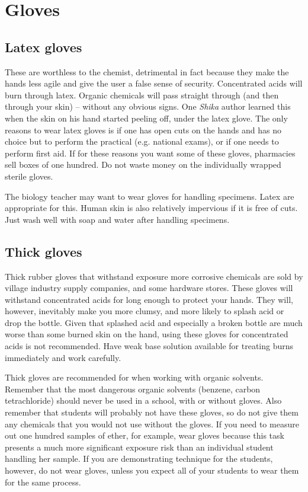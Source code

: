 \section{Gloves}
\label{sec:gloves}

\subsection{Latex gloves}
These are worthless to the chemist, 
detrimental in fact because they make the hands less agile 
and give the user a false sense of security. 
Concentrated acids will burn through latex. 
Organic chemicals will pass straight through (and then through your skin) -- 
without any obvious signs. 
One \textit{Shika} author learned this when the skin on his hand started peeling off, 
under the latex glove. 
The only reasons to wear latex gloves is if one has open cuts on the hands 
and has no choice but to perform the practical (e.g. 
national exams), 
or if one needs to perform first aid. 
If for these reasons you want some of these gloves, 
pharmacies sell boxes of one hundred. 
Do not waste money on the individually wrapped sterile gloves.

The biology teacher may want to wear gloves for handling specimens. 
Latex are appropriate for this. 
Human skin is also relatively impervious if it is free of cuts. 
Just wash well with soap and water after handling specimens.

\subsection{Thick gloves}
Thick rubber gloves that withstand exposure more corrosive chemicals 
are sold by village industry supply companies, 
and some hardware stores. 
These gloves will withstand concentrated acids 
for long enough to protect your hands. 
They will, 
however, 
inevitably make you more clumsy, 
and more likely to splash acid or drop the bottle. 
Given that splashed acid and especially a broken bottle 
are much worse than some burned skin on the hand, 
using these gloves for concentrated acids is not recommended. 
Have weak base solution available for treating burns immediately 
and work carefully.

Thick gloves are recommended for when working with organic solvents. 
Remember that the most dangerous organic solvents (benzene, 
carbon tetrachloride) should never be used in a school, 
with or without gloves. 
Also remember that students will probably not have these gloves, 
so do not give them any chemicals 
that you would not use without the gloves. 
If you need to measure out one hundred samples of ether, 
for example, 
wear gloves because this task presents 
a much more significant exposure risk 
than an individual student handling her sample. 
If you are demonstrating technique for the students, 
however, 
do not wear gloves, 
unless you expect all of your students to wear them for the same process.

